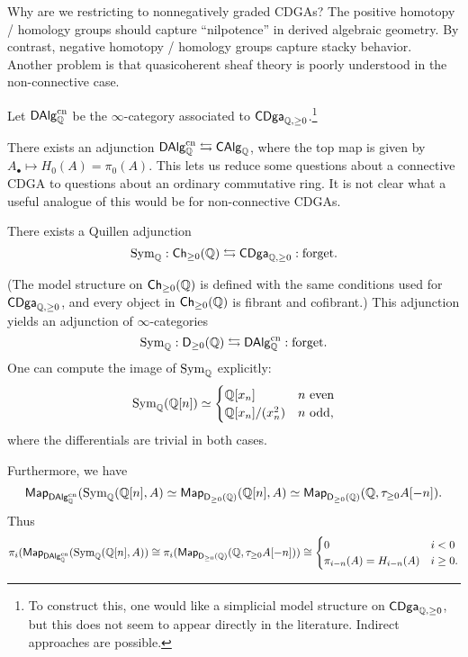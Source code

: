 \documentclass{amsart}
\begin{document}
Why are we restricting to nonnegatively graded CDGAs?
The positive homotopy / homology groups should capture ``nilpotence'' in derived algebraic geometry.
By contrast, negative homotopy / homology groups capture stacky behavior.
Another problem is that quasicoherent sheaf theory is poorly understood in the non-connective case.

\begin{dfn}
	Let $\mathsf{DAlg}_{\mathbb{Q}}^{\mathrm{cn}}$ be the $\infty$-category associated to $\mathsf{CDga}_{\mathbb{Q}, \geq 0}$.\footnote{To construct this, one would like a simplicial model structure on $\mathsf{CDga}_{\mathbb{Q}, \geq 0}$, but this does not seem to appear directly in the literature.
	Indirect approaches are possible.}
\end{dfn}

There exists an adjunction $\mathsf{DAlg}_{\mathbb{Q}}^{\mathrm{cn}} \leftrightarrows \mathsf{CAlg}_{\mathbb{Q}}$, where the top map is given by $A_\bullet \mapsto H_0(A) = \pi_0(A)$.
This lets us reduce some questions about a connective CDGA to questions about an ordinary commutative ring.
It is not clear what a useful analogue of this would be for non-connective CDGAs.

\begin{ex}
	There exists a Quillen adjunction 
	\[
		\operatorname{Sym}_{\mathbb{Q}}: \mathsf{Ch}_{\geq 0}(\mathbb{Q}) \leftrightarrows \mathsf{CDga}_{\mathbb{Q}, \geq 0}: \textrm{forget}.
	\]

	(The model structure on $\mathsf{Ch}_{\geq 0}(\mathbb{Q})$ is defined with the same conditions used for $\mathsf{CDga}_{\mathbb{Q}, \geq 0}$, and every object in $\mathsf{Ch}_{\geq 0}(\mathbb{Q})$ is fibrant and cofibrant.)
	This adjunction yields an adjunction of $\infty$-categories 
	\[
		\operatorname{Sym}_{\mathbb{Q}}: \mathsf{D}_{\geq 0}(\mathbb{Q}) \leftrightarrows \mathsf{DAlg}_{\mathbb{Q}}^{\mathrm{cn}}: \textrm{forget}.
	\]
	One can compute the image of $\operatorname{Sym}_{\mathbb{Q}}$ explicitly:
	\[
		\operatorname{Sym}_{\mathbb{Q}}(\mathbb{Q}[n]) \simeq 
		\begin{cases}
			\mathbb{Q}[x_n] & n \textrm{ even} \\
			\mathbb{Q}[x_n] / (x_n^2) & n \textrm{ odd,}
		\end{cases}
	\]
	where the differentials are trivial in both cases.

	Furthermore, we have
	\[
		\mathsf{Map}_{\mathsf{DAlg}_{\mathbb{Q}}^{\mathrm{cn}}}(\operatorname{Sym}_{\mathbb{Q}}(\mathbb{Q}[n], A) \simeq \mathsf{Map}_{\mathsf{D}_{\geq 0}(\mathbb{Q})}(\mathbb{Q}[n], A) \simeq \mathsf{Map}_{\mathsf{D}_{\geq 0}(\mathbb{Q})}(\mathbb{Q}, \tau_{\geq 0} A[-n]).
	\]
	Thus
	\[
		\pi_i(\mathsf{Map}_{\mathsf{DAlg}_{\mathbb{Q}}^{\mathrm{cn}}}(\operatorname{Sym}_{\mathbb{Q}}(\mathbb{Q}[n], A)) \cong \pi_i(\mathsf{Map}_{\mathsf{D}_{\geq 0}(\mathbb{Q})}(\mathbb{Q}, \tau_{\geq 0} A[-n])) \cong
		\begin{cases}
			0 & i < 0 \\
			\pi_{i-n}(A) = H_{i-n}(A) & i \geq 0.
		\end{cases}
	\]
\end{ex}
\end{document}
